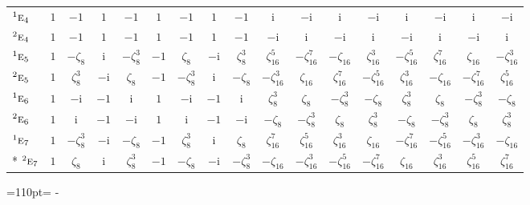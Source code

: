 \documentclass[10pt,a4paper]{article}
\newcommand{\needspace}[1]{\par\penalty-100\begingroup\dimen0=#1\relax\dimen2=\pagegoal
  \advance\dimen2-\pagetotal\ifdim\dimen0>\dimen2\relax\ifdim\dimen2>0pt\vfil\break\fi\fi
  \endgroup}
\numberwithin{equation}{section}
\newcommand{\irr}[1]{\text{\normalfont\scshape #1}}
\newcommand{\conjpair}[1]{{}^{#1}}
\newcommand{\iunit}{\mathrm{i}}
\newcommand{\rootunity}[1]{\zeta_{#1}}
\begin{document}
{\begin{longtable}{@{}lcccccccccccccccc@{}}
$\conjpair{1}\irr{e}_{4}$ & $1$ & $-1$ & $1$ & $-1$ & $1$ & $-1$ & $1$ & $-1$ & $\iunit{}$ & $-\iunit{}$ & $\iunit{}$ & $-\iunit{}$ & $\iunit{}$ & $-\iunit{}$ & $\iunit{}$ & $-\iunit{}$\\
$\conjpair{2}\irr{e}_{4}$ & $1$ & $-1$ & $1$ & $-1$ & $1$ & $-1$ & $1$ & $-1$ & $-\iunit{}$ & $\iunit{}$ & $-\iunit{}$ & $\iunit{}$ & $-\iunit{}$ & $\iunit{}$ & $-\iunit{}$ & $\iunit{}$\\
$\conjpair{1}\irr{e}_{5}$ & $1$ & $-\rootunity{8}$ & $\iunit{}$ & $-\rootunity{8}^{3}$ & $-1$ & $\rootunity{8}$ & $-\iunit{}$ & $\rootunity{8}^{3}$ & $\rootunity{16}^{5}$ & $-\rootunity{16}^{7}$ & $-\rootunity{16}$ & $\rootunity{16}^{3}$ & $-\rootunity{16}^{5}$ & $\rootunity{16}^{7}$ & $\rootunity{16}$ & $-\rootunity{16}^{3}$\\
$\conjpair{2}\irr{e}_{5}$ & $1$ & $\rootunity{8}^{3}$ & $-\iunit{}$ & $\rootunity{8}$ & $-1$ & $-\rootunity{8}^{3}$ & $\iunit{}$ & $-\rootunity{8}$ & $-\rootunity{16}^{3}$ & $\rootunity{16}$ & $\rootunity{16}^{7}$ & $-\rootunity{16}^{5}$ & $\rootunity{16}^{3}$ & $-\rootunity{16}$ & $-\rootunity{16}^{7}$ & $\rootunity{16}^{5}$\\
$\conjpair{1}\irr{e}_{6}$ & $1$ & $-\iunit{}$ & $-1$ & $\iunit{}$ & $1$ & $-\iunit{}$ & $-1$ & $\iunit{}$ & $\rootunity{8}^{3}$ & $\rootunity{8}$ & $-\rootunity{8}^{3}$ & $-\rootunity{8}$ & $\rootunity{8}^{3}$ & $\rootunity{8}$ & $-\rootunity{8}^{3}$ & $-\rootunity{8}$\\
$\conjpair{2}\irr{e}_{6}$ & $1$ & $\iunit{}$ & $-1$ & $-\iunit{}$ & $1$ & $\iunit{}$ & $-1$ & $-\iunit{}$ & $-\rootunity{8}$ & $-\rootunity{8}^{3}$ & $\rootunity{8}$ & $\rootunity{8}^{3}$ & $-\rootunity{8}$ & $-\rootunity{8}^{3}$ & $\rootunity{8}$ & $\rootunity{8}^{3}$\\
$\conjpair{1}\irr{e}_{7}$ & $1$ & $-\rootunity{8}^{3}$ & $-\iunit{}$ & $-\rootunity{8}$ & $-1$ & $\rootunity{8}^{3}$ & $\iunit{}$ & $\rootunity{8}$ & $\rootunity{16}^{7}$ & $\rootunity{16}^{5}$ & $\rootunity{16}^{3}$ & $\rootunity{16}$ & $-\rootunity{16}^{7}$ & $-\rootunity{16}^{5}$ & $-\rootunity{16}^{3}$ & $-\rootunity{16}$\\*
$\conjpair{2}\irr{e}_{7}$ & $1$ & $\rootunity{8}$ & $\iunit{}$ & $\rootunity{8}^{3}$ & $-1$ & $-\rootunity{8}$ & $-\iunit{}$ & $-\rootunity{8}^{3}$ & $-\rootunity{16}$ & $-\rootunity{16}^{3}$ & $-\rootunity{16}^{5}$ & $-\rootunity{16}^{7}$ & $\rootunity{16}$ & $\rootunity{16}^{3}$ & $\rootunity{16}^{5}$ & $\rootunity{16}^{7}$\\
\bottomrule\end{longtable}}
\needspace{110pt}
\end{document}
